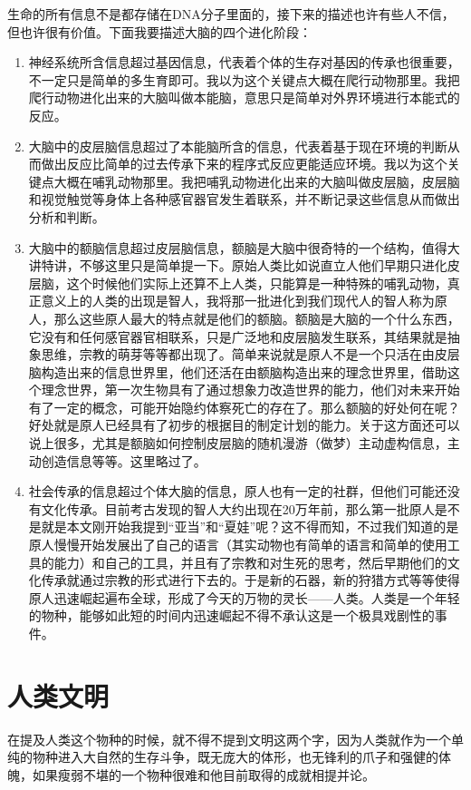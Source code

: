\documentclass[12pt]{exam}%
\begin{document}
生命的所有信息不是都存储在DNA分子里面的，接下来的描述也许有些人不信，但也许很有价值。下面我要描述大脑的四个进化阶段：
\begin{enumerate}
\item 神经系统所含信息超过基因信息，代表着个体的生存对基因的传承也很重要，不一定只是简单的多生育即可。我以为这个关键点大概在爬行动物那里。我把爬行动物进化出来的大脑叫做本能脑，意思只是简单对外界环境进行本能式的反应。
\item 大脑中的皮层脑信息超过了本能脑所含的信息，代表着基于现在环境的判断从而做出反应比简单的过去传承下来的程序式反应更能适应环境。我以为这个关键点大概在哺乳动物那里。我把哺乳动物进化出来的大脑叫做皮层脑，皮层脑和视觉触觉等身体上各种感官器官发生着联系，并不断记录这些信息从而做出分析和判断。
\item 大脑中的额脑信息超过皮层脑信息，额脑是大脑中很奇特的一个结构，值得大讲特讲，不够这里只是简单提一下。原始人类比如说直立人他们早期只进化皮层脑，这个时候他们实际上还算不上人类，只能算是一种特殊的哺乳动物，真正意义上的人类的出现是智人，我将那一批进化到我们现代人的智人称为原人，那么这些原人最大的特点就是他们的额脑。额脑是大脑的一个什么东西，它没有和任何感官器官相联系，只是广泛地和皮层脑发生联系，其结果就是抽象思维，宗教的萌芽等等都出现了。简单来说就是原人不是一个只活在由皮层脑构造出来的信息世界里，他们还活在由额脑构造出来的理念世界里，借助这个理念世界，第一次生物具有了通过想象力改造世界的能力，他们对未来开始有了一定的概念，可能开始隐约体察死亡的存在了。那么额脑的好处何在呢？好处就是原人已经具有了初步的根据目的制定计划的能力。关于这方面还可以说上很多，尤其是额脑如何控制皮层脑的随机漫游（做梦）主动虚构信息，主动创造信息等等。这里略过了。
\item 社会传承的信息超过个体大脑的信息，原人也有一定的社群，但他们可能还没有文化传承。目前考古发现的智人大约出现在20万年前，那么第一批原人是不是就是本文刚开始我提到“亚当”和“夏娃”呢？这不得而知，不过我们知道的是原人慢慢开始发展出了自己的语言（其实动物也有简单的语言和简单的使用工具的能力）和自己的工具，并且有了宗教和对生死的思考，然后早期他们的文化传承就通过宗教的形式进行下去的。于是新的石器，新的狩猎方式等等使得原人迅速崛起遍布全球，形成了今天的万物的灵长——人类。人类是一个年轻的物种，能够如此短的时间内迅速崛起不得不承认这是一个极具戏剧性的事件。

\end{enumerate}


\section{人类文明}
在提及人类这个物种的时候，就不得不提到文明这两个字，因为人类就作为一个单纯的物种进入大自然的生存斗争，既无庞大的体形，也无锋利的爪子和强健的体魄，如果瘦弱不堪的一个物种很难和他目前取得的成就相提并论。
\end{document}
